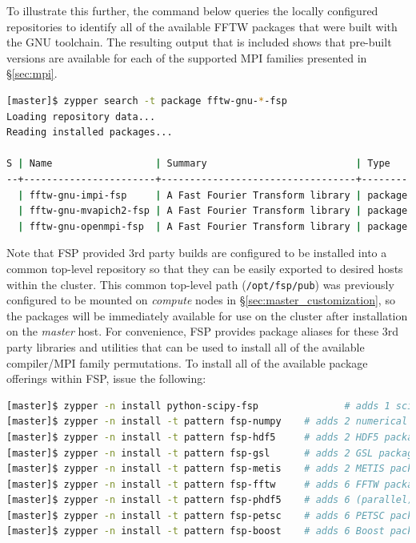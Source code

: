 \documentclass[letterpaper]{article}
\begin{document}
To illustrate this further, the command below queries the locally configured
repositories to identify all of the available FFTW packages that were built
with the GNU toolchain. The resulting output that is included shows that
pre-built versions are available for each of the supported MPI families
presented in \S\ref{sec:mpi}.

\begin{lstlisting}[language=bash]
[master]$ zypper search -t package fftw-gnu-*-fsp
Loading repository data...
Reading installed packages...

S | Name                  | Summary                          | Type   
--+-----------------------+----------------------------------+--------
  | fftw-gnu-impi-fsp     | A Fast Fourier Transform library | package
  | fftw-gnu-mvapich2-fsp | A Fast Fourier Transform library | package
  | fftw-gnu-openmpi-fsp  | A Fast Fourier Transform library | package
\end{lstlisting}

Note that FSP provided 3rd party builds are configured to be installed
into a common top-level repository so that they can be easily exported to
desired hosts within the cluster. This common top-level path
(\texttt{/opt/fsp/pub}) was previously configured to be mounted on {\em
  compute} nodes in \S\ref{sec:master_customization}, so the packages will be
immediately available for use on the cluster after installation on the {\em
  master} host.  For convenience, FSP provides package aliases for these 3rd
party libraries and utilities that can be used to install all of the available
compiler/MPI family permutations. To install all of the available package
offerings within FSP, issue the following:

\begin{lstlisting}[language=bash]
[master]$ zypper -n install python-scipy-fsp               # adds 1 scientific python package
[master]$ zypper -n install -t pattern fsp-numpy    # adds 2 numerical python packages
[master]$ zypper -n install -t pattern fsp-hdf5     # adds 2 HDF5 packages
[master]$ zypper -n install -t pattern fsp-gsl      # adds 2 GSL packages
[master]$ zypper -n install -t pattern fsp-metis    # adds 2 METIS packages
[master]$ zypper -n install -t pattern fsp-fftw     # adds 6 FFTW packages
[master]$ zypper -n install -t pattern fsp-phdf5    # adds 6 (parallel) HDF5 packages
[master]$ zypper -n install -t pattern fsp-petsc    # adds 6 PETSC packages
[master]$ zypper -n install -t pattern fsp-boost    # adds 6 Boost packages
\end{lstlisting}
\end{document}
